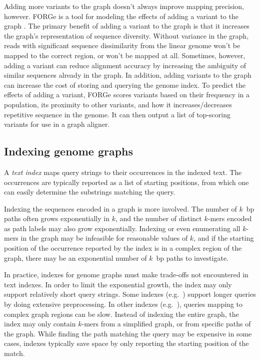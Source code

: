 Adding more variants to the graph doesn't always improve mapping precision, however.
FORGe is a tool for modeling the effects of adding a variant to the graph \cite{Pritt_2018}. 
The primary benefit of adding a variant to the graph is that it increases the graph's representation of sequence diversity.
Without variance in the graph, reads with significant sequence dissimilarity from the linear genome won't be mapped to the correct region, or won't be mapped at all.
Sometimes, however, adding a variant can reduce alignment accuracy by increasing the ambiguity of similar sequences already in the graph.
In addition, adding variants to the graph can increase the cost of storing and querying the genome index.
To predict the effects of adding a variant, FORGe scores variants based on their frequency in a population, its proximity to other variants, and how it increases/decreases repetitive sequence in the genome.
It can then output a list of top-scoring variants for use in a graph aligner.


\subsection{Indexing genome graphs}

A \emph{text index} maps query strings to their occurrences in the indexed text.
The occurrences are typically reported as a list of starting positions, from which one can easily determine the substrings matching the query.

Indexing the sequences encoded in a graph is more involved.
The number of $k$~bp paths often grows exponentially in $k$, and the number of distinct $k$-mers encoded as path labels may also grow exponentially.
Indexing or even enumerating all $k$-mers in the graph may be infeasible for reasonable values of $k$, and if the starting position of the occurrence reported by the index is in a complex region of the graph, there may be an exponential number of $k$~bp paths to investigate.

In practice, indexes for genome graphs must make trade-offs not encountered in text indexes.
In order to limit the exponential growth, the index may only support relatively short query strings.
Some indexes (e.g.\ \cite{Siren_2014}) support longer queries by doing extensive preprocessing.
In other indexes (e.g.\ \cite{Thachuk_2013,Huang_2013,Maciuca_2016}), queries mapping to complex graph regions can be slow.
Instead of indexing the entire graph, the index may only contain $k$-mers from a simplified graph, or from specific paths of the graph.
While finding the path matching the query may be expensive in some cases, indexes typically save space by only reporting the starting position of the match.

